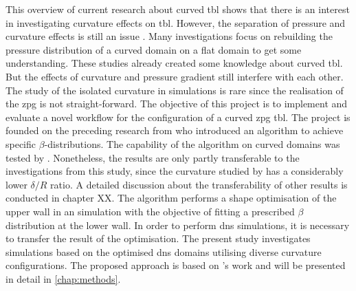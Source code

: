 This overview of current research about curved \acrshort{tbl} shows that there is an interest in investigating curvature effects on \acrshort{tbl}.
However, the separation of pressure and curvature effects is still an issue \citep{appelbaum_systematic_2025}.
Many investigations focus on rebuilding the pressure distribution of a curved domain on a flat domain to get some understanding.
These studies already created some knowledge about curved \acrshort{tbl}.
But  the effects of curvature and pressure gradient still interfere with each other.
The study of the isolated curvature in simulations is rare since the realisation of the \acrshort{zpg} is not straight-forward.
The objective of this project is to implement and evaluate a novel workflow for the configuration of a curved \acrshort{zpg} \acrshort{tbl}.
The project is founded on the preceding research from \citet{morita_applying_2022} who introduced an algorithm to achieve specific $\beta$-distributions.
The capability of the algorithm on curved domains was tested by \citet{ganagdhar_bayesian_2025}.
Nonetheless, the results are only partly transferable to the investigations from this study, since the curvature studied by \citet{ganagdhar_bayesian_2025} has a considerably  lower $\delta/R$ ratio. 
A detailed discussion about the transferability of other results is conducted in chapter XX.
The algorithm performs a shape optimisation of the upper wall in an  simulation with the objective of fitting a prescribed $\beta$ distribution at the lower wall.
In order to perform \acrshort{dns} simulations, it is necessary to transfer the result of the optimisation.
The present study investigates simulations based on the optimised \acrshort{dns}  domains utilising   diverse curvature configurations.   
The proposed approach is based on \citet{schlatter_leveraging_nodate}'s work and will be presented in detail in \autoref{chap:methods}.





